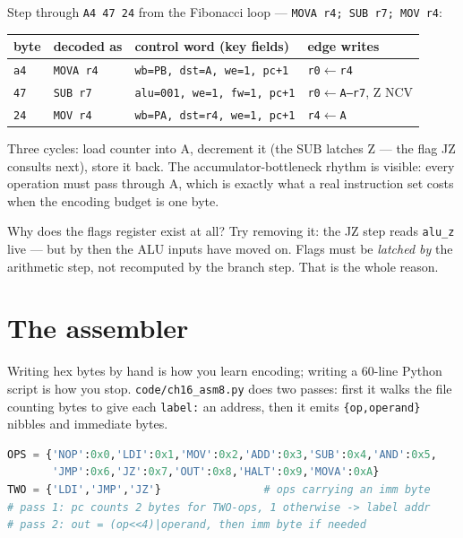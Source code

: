 \begin{example}
Step through \texttt{A4 47 24} from the Fibonacci loop ---
\texttt{MOVA r4; SUB r7; MOV r4}:

\begin{center}
\begin{tabular}{llll}
\toprule
byte & decoded as & control word (key fields) & edge writes\\
\midrule
\texttt{a4} & \texttt{MOVA r4} & \texttt{wb=PB, dst=A, we=1, pc+1} & \texttt{r0$\leftarrow$r4}\\
\texttt{47} & \texttt{SUB r7} & \texttt{alu=001, we=1, fw=1, pc+1} & \texttt{r0$\leftarrow$A--r7}, Z NCV\\
\texttt{24} & \texttt{MOV r4} & \texttt{wb=PA, dst=r4, we=1, pc+1} & \texttt{r4$\leftarrow$A}\\
\bottomrule
\end{tabular}
\end{center}

Three cycles: load counter into A, decrement it (the SUB latches Z
--- the flag JZ consults next), store it back. The
accumulator-bottleneck rhythm is visible: every operation must pass
through A, which is exactly what a real instruction set costs when
the encoding budget is one byte.
\end{example}

\begin{checkpoint}
Why does the flags register exist at all? Try removing it: the JZ
step reads \texttt{alu\_z} live --- but by then the ALU inputs have
moved on. Flags must be \emph{latched by} the arithmetic step, not
recomputed by the branch step. That is the whole reason.
\end{checkpoint}

\section{The assembler}\label{sec:asm16}

Writing hex bytes by hand is how you learn encoding; writing a
60-line Python script is how you stop. \texttt{code/ch16\_asm8.py}
does two passes: first it walks the file counting bytes to give each
\texttt{label:} an address, then it emits \texttt{\{op,operand\}}
nibbles and immediate bytes.

\begin{lstlisting}[language=Python, caption={The assembler's core ---
from \ttfamily code/ch16\_asm8.py. Two passes: labels first, bytes
second.}, label={lst:asm16}]
OPS = {'NOP':0x0,'LDI':0x1,'MOV':0x2,'ADD':0x3,'SUB':0x4,'AND':0x5,
       'JMP':0x6,'JZ':0x7,'OUT':0x8,'HALT':0x9,'MOVA':0xA}
TWO = {'LDI','JMP','JZ'}                # ops carrying an imm byte
# pass 1: pc counts 2 bytes for TWO-ops, 1 otherwise -> label addr
# pass 2: out = (op<<4)|operand, then imm byte if needed
\end{lstlisting}

